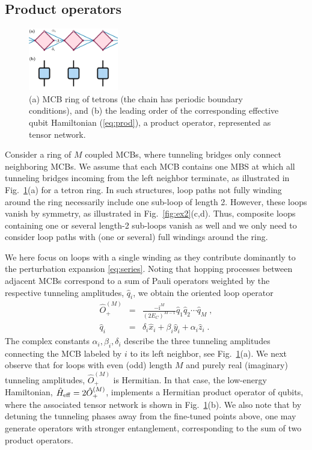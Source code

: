 \documentclass[twocolumn,floats,prx,showpacs]{revtex4-1}
\begin{document}
\subsection{Product operators}\label{sec3a}

\begin{figure}
\includegraphics[width=0.35\textwidth]{fig/tetron_prod.pdf}
\caption{(a) MCB ring of tetrons (the chain has periodic boundary conditions), and (b) the leading order of the corresponding effective qubit Hamiltonian (\ref{eq:prod}), a product operator, represented as tensor network.}
\label{fig:tetron_prod}
\end{figure}

Consider a ring of $M$ coupled MCBs, where tunneling bridges only connect neighboring MCBs.  We assume that each MCB contains one MBS at which all tunneling bridges incoming from the left neighbor terminate, as illustrated in Fig.~\ref{fig:tetron_prod}(a) for a tetron ring. In such structures,  loop paths not fully winding around the ring necessarily include one sub-loop of length 2. However, these loops vanish by symmetry, as illustrated in Fig.~\ref{fig:ex2}(c,d). Thus, composite loops containing one or several length-2 sub-loops vanish as well and we only need to consider loop paths with (one or several) full windings around the ring.

We here focus on loops with a single winding as they contribute dominantly to the perturbation expansion \eqref{eq:series}. Noting that hopping processes between adjacent MCBs correspond to a sum of Pauli operators weighted by the respective tunneling amplitudes, $\hat q_i$, we obtain the oriented loop operator 
\begin{eqnarray}
\hat O_+^{(M)} &=& \frac{-\mathrm i^M}{(2E_C)^{M-1}} \hat q_1 \hat q_2 \cdots \hat q_M  \label{eq:prod} \;,\\ 
\hat q_i &=& \delta_i \hat x_i + \beta_i \hat y_i + \alpha_i \hat z_i \;.
\end{eqnarray}
The complex constants $\alpha_i,\beta_i,\delta_i$ describe the three tunneling amplitudes connecting the MCB labeled by $i$ to its left neighbor, see Fig.~\ref{fig:tetron_prod}(a). We next observe that for loops with even (odd) length $M$ and purely real (imaginary) tunneling amplitudes, $\hat O^{(M)}_+$ is Hermitian.  In that case, the low-energy Hamiltonian, $\hat H_{\rm eff}=2\hat O_+^{(M)}$, implements a Hermitian product 
operator of qubits, where
the associated tensor network is shown in Fig.~\ref{fig:tetron_prod}(b).
We also note that by detuning the tunneling phases away from the fine-tuned points above, one may generate operators with stronger entanglement, corresponding to the sum of two product operators. 
\end{document}

